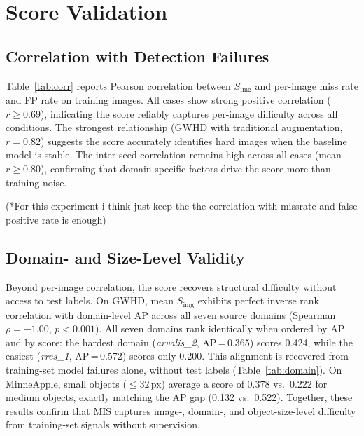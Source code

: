 \documentclass[conference]{IEEEtran}
\begin{document}
\section{Score Validation}
\label{sec:validation}

\subsection{Correlation with Detection Failures}

Table~\ref{tab:corr} reports Pearson correlation between
$S_{\mathrm{img}}$ and per-image miss rate and FP rate on training
images. All cases show strong positive correlation ($r \ge 0.69$),
indicating the score reliably captures per-image difficulty across all
conditions. The strongest relationship (GWHD with traditional
augmentation, $r{=}0.82$) suggests the score accurately identifies hard
images when the baseline model is stable. The inter-seed correlation
remains high across all cases (mean $r \ge 0.80$), confirming that
domain-specific factors drive the score more than training noise.

(*For this experiment i think just keep the the correlation with missrate 
and false positive rate is enough)

\begin{table}[t]
\centering
\caption{Pearson correlation of $S_{\mathrm{img}}$ with per-image miss
rate and FP rate (training set, with traditional augmentation).}
\label{tab:corr}
\end{table}

\subsection{Domain- and Size-Level Validity}

Beyond per-image correlation, the score recovers structural difficulty
without access to test labels. On GWHD, mean $S_{\mathrm{img}}$ exhibits
perfect inverse rank correlation with domain-level AP across all seven
source domains (Spearman $\rho{=}{-}1.00$, $p{<}0.001$). All seven
domains rank identically when ordered by AP and by score: the hardest
domain (\textit{arvalis\_2}, AP\,=\,0.365) scores 0.424, while the
easiest (\textit{rres\_1}, AP\,=\,0.572) scores only 0.200. This
alignment is recovered from training-set model failures alone, without
test labels (Table~\ref{tab:domain}). On MinneApple, small objects
(${\le}32$\,px) average a score of 0.378 vs.\ 0.222 for medium objects,
exactly matching the AP gap (0.132 vs.\ 0.522). Together, these results
confirm that MIS captures image-, domain-, and object-size-level
difficulty from training-set signals without supervision.
\end{document}
